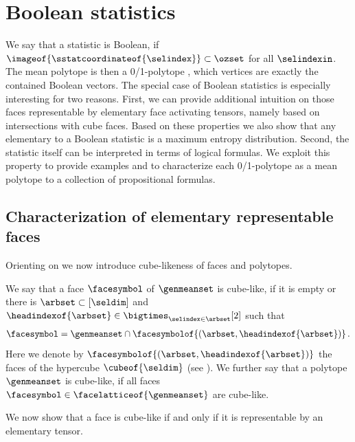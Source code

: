 \section{Boolean statistics}\label{sec:booleanStat}

We say that a statistic is Boolean, if $\imageof{\sstatcoordinateof{\selindex}}\subset\ozset$ for all $\selindexin$.
The mean polytope is then a 0/1-polytope \cite{ziegler_lectures_2000}, which vertices are exactly the contained Boolean vectors.
The special case of Boolean statistics is especially interesting for two reasons.
First, we can provide additional intuition on those faces representable by elementary face activating tensors, namely based on intersections with cube faces.
Based on these properties we also show that any elementary \ComputationActivationNetwork{} to a Boolean statistic is a maximum entropy distribution.
Second, the statistic itself can be interpreted in terms of logical formulas.
We exploit this property to provide examples and to characterize each 0/1-polytope as a mean polytope to a collection of propositional formulas.

\subsection{Characterization of elementary representable faces}

Orienting on  we now introduce cube-likeness of faces and polytopes.

\begin{definition}
    \label{def:cubeLike}
    We say that a face $\facesymbol$ of $\genmeanset$ is cube-like, if it is empty or there is $\arbset\subset[\seldim]$ and $\headindexof{\arbset}\in\bigtimes_{\selindex\in\arbset}[2]$ such that
    \begin{align*}
        \facesymbol
        = \genmeanset \cap \facesymbolof{(\arbset,\headindexof{\arbset})} \, .
    \end{align*}
    Here we denote by $\facesymbolof{(\arbset,\headindexof{\arbset})}$ the faces of the hypercube $\cubeof{\seldim}$ (see ).
    We further say that a polytope $\genmeanset$ is cube-like, if all faces $\facesymbol\in\facelatticeof{\genmeanset}$ are cube-like.
\end{definition}

We now show that a face is cube-like if and only if it is representable by an elementary tensor.

